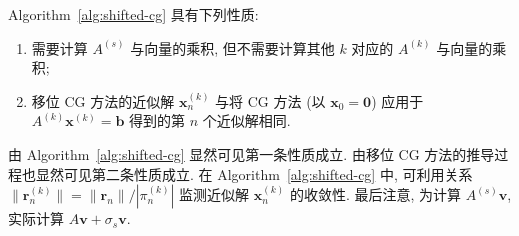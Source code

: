 {Algorithm\ \ref{alg:shifted-cg} 具有下列性质:}
\begin{enumerate}
\item {需要计算 $A^{(s)}$ 与向量的乘积, 但不需要计算其他 $k$ 对应的 $A^{(k)}$ 与向量的乘积;}
\item {移位 CG 方法的近似解 $\bm x_n^{(k)}$ 与将 CG 方法 (以 $\bm x_0=\bm0$) 应用于 $A^{(k)}\bm x^{(k)}=\bm b$ 得到的第 $n$ 个近似解相同.}
\end{enumerate}
{由 Algorithm\ \ref{alg:shifted-cg} 显然可见第一条性质成立. 由移位 CG 方法的推导过程也显然可见第二条性质成立. 在 Algorithm\ \ref{alg:shifted-cg} 中, 可利用关系 $\|\bm r_n^{(k)}\|=\|\bm r_n\|/|\pi_n^{(k)}|$ 监测近似解 $\bm x_n^{(k)}$ 的收敛性. 最后注意, 为计算 $A^{(s)}\bm v$, 实际计算 $A\bm v+\sigma_s\bm v$.}
